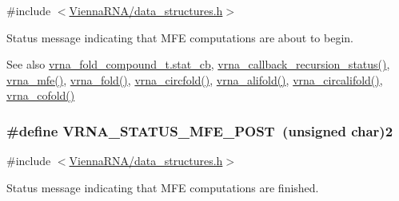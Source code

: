 {\ttfamily \#include $<$\hyperlink{data__structures_8h}{Vienna\+R\+N\+A/data\+\_\+structures.\+h}$>$}



Status message indicating that M\+FE computations are about to begin. 

\begin{DoxySeeAlso}{See also}
\hyperlink{group__fold__compound_a87a83f6795b569000efcbe65acc3dd81}{vrna\+\_\+fold\+\_\+compound\+\_\+t.\+stat\+\_\+cb}, \hyperlink{group__fold__compound_ga4a4a0d838de6d18315bafc84f93f5cc0}{vrna\+\_\+callback\+\_\+recursion\+\_\+status()}, \hyperlink{group__mfe__fold_gabd3b147371ccf25c577f88bbbaf159fd}{vrna\+\_\+mfe()}, \hyperlink{group__mfe__fold__single_ga29a33b2895f4e67b0480271ff289afdc}{vrna\+\_\+fold()}, \hyperlink{group__mfe__fold__single_gaf973483d8acbc8cc9aacfc8a9b7f0074}{vrna\+\_\+circfold()}, \hyperlink{group__consensus__mfe__fold_ga6c9d3bef3e92c6d423ffac9f981418c1}{vrna\+\_\+alifold()}, \hyperlink{group__consensus__mfe__fold_ga17a1be7490468c29c335ba9bffacba53}{vrna\+\_\+circalifold()}, \hyperlink{group__mfe__cofold_ga9ef3a297201dbf838a8daff2b45c0c82}{vrna\+\_\+cofold()} 
\end{DoxySeeAlso}
\subsubsection[{\texorpdfstring{V\+R\+N\+A\+\_\+\+S\+T\+A\+T\+U\+S\+\_\+\+M\+F\+E\+\_\+\+P\+O\+ST}{VRNA_STATUS_MFE_POST}}]{\setlength{\rightskip}{0pt plus 5cm}\#define V\+R\+N\+A\+\_\+\+S\+T\+A\+T\+U\+S\+\_\+\+M\+F\+E\+\_\+\+P\+O\+ST~(unsigned char)2}\hypertarget{group__fold__compound_ga47c900ca76e56e59e2e83a06e0bde641}{}\label{group__fold__compound_ga47c900ca76e56e59e2e83a06e0bde641}


{\ttfamily \#include $<$\hyperlink{data__structures_8h}{Vienna\+R\+N\+A/data\+\_\+structures.\+h}$>$}



Status message indicating that M\+FE computations are finished. 

